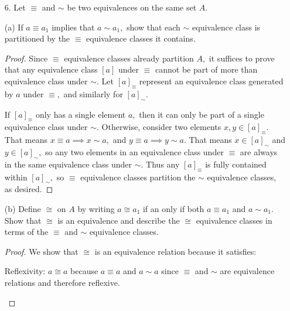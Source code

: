 \documentclass{article}
\begin{document}
\begin{itemize}
\begin{proof}
\begin{enumerate}
					\ii Transitivity: If $(x, y)\equiv(a, b),$ and $(a, b)\equiv(p, q),$ then $y/x=b/a$ and $b/a=q/p,$ so then $y/x=q/p$ so $(x, y)\equiv(p, q).$
				\end{enumerate}

				The equivalence classes are the lines $y=kx$ for $k\in\RR^+,$ so $\sigma$ can map these lines to the value $k$ of their slope. This is well-defined and bijective because each line only gets mapped to a single value corresponding to its slope, and the slope uniquely determines the line. Specifically, $\sigma([x, y])=y/x$ is the mapping. 

			\end{proof}

	\item[6.] Let $\equiv$ and $\sim$ be two equivalences on the same set $A.$

		(a) If $a\equiv a_1$ implies that $a\sim a_1,$ show that each $\sim$ equivalence class is partitioned by the $\equiv$ equivalence classes it contains.
			\begin{proof}
				Since $\equiv$ equivalence classes already partition $A,$ it suffices to prove that any equivalence class $[a]$ under $\equiv$ cannot be part of more than equivalence class under $\sim.$ Let $[a]_{\equiv}$ represent an equivalence class generated by $a$ under $\equiv,$ and similarly for $[a]_{\sim}.$ 
			
				If $[a]_\equiv$ only has a single element $a,$ then it can only be part of a single equivalence class under $\sim.$ Otherwise, consider two elements $x, y\in[a]_\equiv.$ That means $x\equiv a \implies x\sim a,$ and $y\equiv a\implies y\sim a.$ That means $x\in[a]_\sim$ and $y\in[a]_\sim,$ so any two elements in an equivalence class under $\equiv$ are always in the same equivalence class under $\sim.$ Thus any $[a]_\equiv$ is fully contained within $[a]_\sim,$ so $\equiv$ equivalence classes partition the $\sim$ equivalence classes, as desired.

			\end{proof}

		(b) Define $\cong$ on $A$ by writing $a\cong a_1$ if an only if both $a\equiv a_1$ and $a\sim a_1.$ Show that $\cong$ is an equivalence and describe the $\cong$ equivalence classes in terms of the $\equiv$ and $\sim$ equivalence classes.
			\begin{proof}
				We show that $\cong$ is an equivalence relation because it satisfies:
				\begin{enumerate}
					\ii Reflexivity: $a\cong a$ because $a\equiv a$ and $a\sim a$ since $\equiv$ and $\sim$ are equivalence relations and therefore reflexive.


\end{enumerate}
\end{proof}
\end{itemize}
\end{document}
